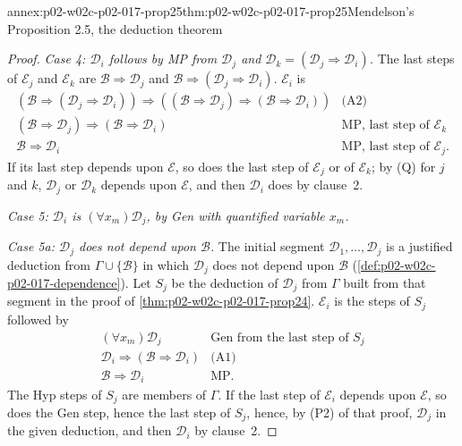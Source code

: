 \begin{annexitem}{annex:p02-w02c-p02-017-prop25}{thm:p02-w02c-p02-017-prop25}{Mendelson's Proposition 2.5, the deduction theorem}
\begin{proof}
\emph{Case 4: \(\mathscr D_i\) follows by MP from \(\mathscr D_j\) and
\(\mathscr D_k=(\mathscr D_j\Rightarrow\mathscr D_i)\).}  The last steps of
\(\mathcal E_j\) and \(\mathcal E_k\) are \(\mathscr B\Rightarrow\mathscr D_j\)
and \(\mathscr B\Rightarrow(\mathscr D_j\Rightarrow\mathscr D_i)\).
\(\mathcal E_i\) is
\[
\begin{array}{ll}
 (\mathscr B\Rightarrow(\mathscr D_j\Rightarrow\mathscr D_i))\Rightarrow
 ((\mathscr B\Rightarrow\mathscr D_j)\Rightarrow
  (\mathscr B\Rightarrow\mathscr D_i)) & \text{(A2)}\\
 (\mathscr B\Rightarrow\mathscr D_j)\Rightarrow
  (\mathscr B\Rightarrow\mathscr D_i)
   & \text{MP, last step of }\mathcal E_k\\
 \mathscr B\Rightarrow\mathscr D_i
   & \text{MP, last step of }\mathcal E_j.
\end{array}
\]
If its last step depends upon \(\mathscr E\), so does the last step of
\(\mathcal E_j\) or of \(\mathcal E_k\); by (Q) for \(j\) and \(k\),
\(\mathscr D_j\) or \(\mathscr D_k\) depends upon \(\mathscr E\), and then
\(\mathscr D_i\) does by clause~2.

\emph{Case 5: \(\mathscr D_i\) is \((\forall x_m)\mathscr D_j\), by Gen with
quantified variable \(x_m\).}

\emph{Case 5a: \(\mathscr D_j\) does not depend upon \(\mathscr B\).}  The
initial segment \(\mathscr D_1,\ldots,\mathscr D_j\) is a justified deduction
from \(\Gamma\cup\{\mathscr B\}\) in which \(\mathscr D_j\) does not depend
upon \(\mathscr B\) (\cref{def:p02-w02c-p02-017-dependence}).  Let \(S_j\) be
the deduction of \(\mathscr D_j\) from \(\Gamma\) built from that segment in
the proof of \cref{thm:p02-w02c-p02-017-prop24}.  \(\mathcal E_i\) is
the steps of \(S_j\) followed by
\[
\begin{array}{ll}
 (\forall x_m)\mathscr D_j & \text{Gen from the last step of }S_j\\
 \mathscr D_i\Rightarrow(\mathscr B\Rightarrow\mathscr D_i) & \text{(A1)}\\
 \mathscr B\Rightarrow\mathscr D_i & \text{MP}.
\end{array}
\]
The Hyp steps of \(S_j\) are members of \(\Gamma\).  If the last step of
\(\mathcal E_i\) depends upon \(\mathscr E\), so does the Gen step, hence the
last step of \(S_j\), hence, by (P2) of that proof, \(\mathscr D_j\) in the
given deduction, and then \(\mathscr D_i\) by clause~2.


\end{proof}
\end{annexitem}
